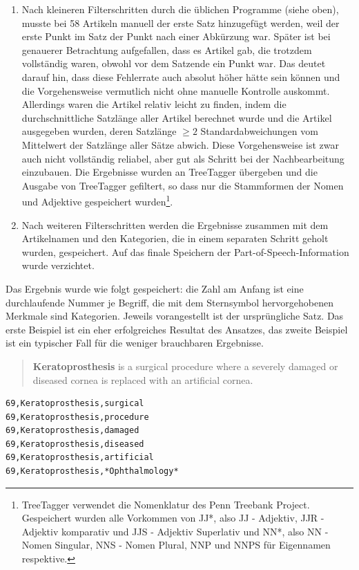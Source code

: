 \documentclass[pagesize,paper=A4,DIV=calc,fontsize=12pt,draft=false]{scrreprt}
\begin{document}
\begin{enumerate}
\item Nach kleineren Filterschritten durch die üblichen Programme (siehe oben), musste bei 58 Artikeln manuell der erste Satz hinzugefügt werden, weil der erste Punkt im Satz der Punkt nach einer Abkürzung war. 
Später ist bei genauerer Betrachtung aufgefallen, dass es Artikel gab, die trotzdem vollständig waren, obwohl vor dem Satzende ein Punkt war. 
Das deutet darauf hin, dass diese Fehlerrate auch absolut höher hätte sein können und die Vorgehensweise vermutlich nicht ohne manuelle Kontrolle auskommt. 
Allerdings waren die Artikel relativ leicht zu finden, indem die durchschnittliche Satzlänge aller Artikel berechnet wurde und die Artikel ausgegeben wurden, deren Satzlänge $\geq 2 $ Standardabweichungen vom Mittelwert der Satzlänge aller Sätze abwich. 
Diese Vorgehensweise ist zwar auch nicht vollständig reliabel, aber gut als Schritt bei der Nachbearbeitung einzubauen. 
Die Ergebnisse wurden an TreeTagger übergeben und die Ausgabe von TreeTagger gefiltert, so dass nur die Stammformen der Nomen und Adjektive gespeichert wurden\footnote{TreeTagger verwendet die Nomenklatur des Penn Treebank Project. 
Gespeichert wurden alle Vorkommen von JJ*, also JJ - Adjektiv, JJR - Adjektiv komparativ und JJS - Adjektiv Superlativ und NN*, also NN - Nomen Singular, NNS - Nomen Plural, NNP und NNPS für Eigennamen respektive.}. 

\item Nach weiteren Filterschritten werden die Ergebnisse zusammen mit dem Artikelnamen und den Kategorien, die in einem separaten Schritt geholt wurden, gespeichert. 
Auf das finale Speichern der Part-of-Speech-Information wurde verzichtet. 
\end{enumerate}

Das Ergebnis wurde wie folgt gespeichert: die Zahl am Anfang ist eine durchlaufende Nummer je Begriff, die mit dem Sternsymbol hervorgehobenen Merkmale sind Kategorien. 
Jeweils vorangestellt ist der ursprüngliche Satz. 
Das erste Beispiel ist ein eher erfolgreiches Resultat des Ansatzes, das zweite Beispiel ist ein typischer Fall für die weniger brauchbaren Ergebnisse. 

\begin{quote}
\textbf{Keratoprosthesis} is a surgical procedure where a severely damaged or diseased cornea is replaced with an artificial cornea.
\end{quote}

\lstset{
language=Bash
}

\begin{lstlisting}[caption={Beispiel für eine Ergebnisliste nach Filterung mit Wortartenerkennung. Das in Sternen eingefasste Wort ist die Kategorie.}]
69,Keratoprosthesis,surgical 
69,Keratoprosthesis,procedure
69,Keratoprosthesis,damaged 
69,Keratoprosthesis,diseased
69,Keratoprosthesis,artificial 
69,Keratoprosthesis,*Ophthalmology*
\end{lstlisting}
\end{document}
